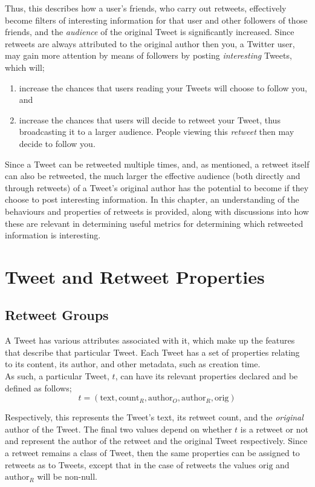 Thus, this describes how a user's friends, who carry out retweets, effectively become filters of interesting information for that user and other followers of those friends, and the \textit{audience} of the original Tweet is significantly increased. Since retweets are always attributed to the original author then you, a Twitter user, may gain more attention by means of followers by posting \textit{interesting} Tweets, which will; 
\begin{enumerate}
\item increase the chances that users reading your Tweets will choose to follow you, and
\item increase the chances that users will decide to retweet your Tweet, thus broadcasting it to a larger audience. People viewing this \textit{retweet} then may decide to follow you. 
\end{enumerate}

Since a Tweet can be retweeted multiple times, and, as mentioned, a retweet itself can also be retweeted, the much larger the effective audience (both directly and through retweets) of a Tweet's original author has the potential to become if they choose to post interesting information. In this chapter, an understanding of the behaviours and properties of retweets is provided, along with discussions into how these are relevant in determining useful metrics for determining which retweeted information is interesting.


\section{Tweet and Retweet Properties}

\subsection{Retweet Groups}
A Tweet has various attributes associated with it, which make up the features that describe that particular Tweet. Each Tweet has a set of properties relating to its content, its author, and other metadata, such as creation time.\\
As such, a particular Tweet, $t$, can have its relevant properties declared and be defined as follows;
\[
	t = (\mathrm{text}, \mathrm{count}_R, \mathrm{author}_O, \mathrm{author}_R, \mathrm{orig})
\]

Respectively, this represents the Tweet's text, its retweet count, and the \textit{original} author of the Tweet. The final two values depend on whether $t$ is a retweet or not and represent the author of the retweet and the original Tweet respectively. Since a retweet remains a class of Tweet, then the same properties can be assigned to retweets as to Tweets, except that in the case of retweets the values $\mathrm{orig}$ and $\mathrm{author}_R$ will be non-null.

